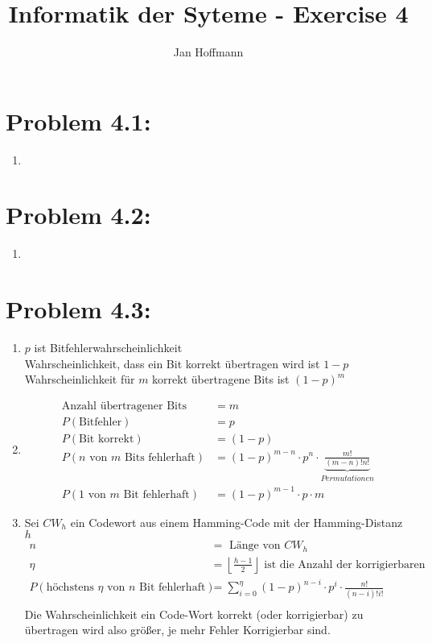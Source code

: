 \documentclass[10pt,a4paper]{article}
\title{Informatik der Syteme - Exercise 4}
\author{Jan Hoffmann}
\begin{document}
\section*{Problem 4.1:}
\begin{enumerate}
  \item
\end{enumerate}

\section*{Problem 4.2:}
\begin{enumerate}
	\item 
\end{enumerate}

\section*{Problem 4.3:}
\begin{enumerate}
	\item$p$ ist Bitfehlerwahrscheinlichkeit\\
		Wahrscheinlichkeit, dass ein Bit korrekt übertragen wird ist $1-p$\\
		Wahrscheinlichkeit für $m$ korrekt übertragene Bits ist $(1-p)^m$
	\item
		\begin{align*}
			\text{Anzahl übertragener Bits} &= m\\
			P(\text{Bitfehler}) &= p\\
			P(\text{Bit korrekt}) &= (1-p)\\
			P(n \text{ von } m \text{ Bits fehlerhaft}) &= (1 - p)^{m-n} \cdot p^n \cdot \underbrace{\frac{m!}{(m-n)!n!}}_{Permutationen} \\
			P(1\text{ von } m \text{ Bit fehlerhaft}) &= (1-p)^{m-1} \cdot p \cdot m
		\end{align*}
	\item
		Sei $CW_h$ ein Codewort aus einem Hamming-Code mit der Hamming-Distanz $h$\\		
		\begin{align*}	
			n &= \text{ Länge von }CW_h \\
			\eta &= \left\lfloor \frac{h-1}{2} \right\rfloor \text{ ist die Anzahl der korrigierbaren Fehler.} \\
			P(\text{höchstens } \eta \text{ von } n \text{ Bit fehlerhaft}) 
				&= \sum_{i=0}^{\eta}{(1 - p)^{n-i} \cdot p^i} \cdot \frac{n!}{(n-i)!i!}\\
		\end{align*}
		Die Wahrscheinlichkeit ein Code-Wort korrekt (oder korrigierbar) zu übertragen wird also größer, je mehr Fehler Korrigierbar sind.	
\end{enumerate}
\end{document}
